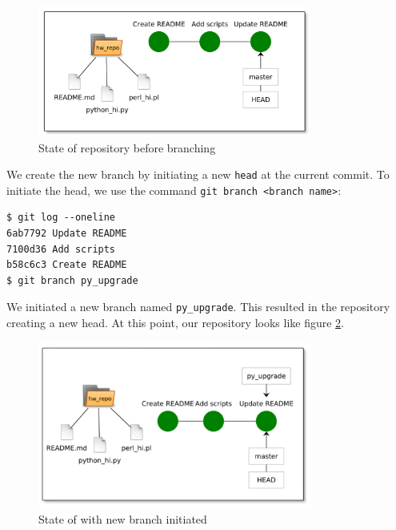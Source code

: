 \documentclass[../main/git_course_main.tex]{subfiles}
\begin{document}
\begin{figure}[h!]
	\centering
	\includegraphics[width=0.8\textwidth]{../visualizations/chapter2/c26_repo_third_commit.pdf}
	\caption{State of repository before branching}
	\label{fig:state_before_branching}
\end{figure}

We create the new branch by initiating a new \verb$head$ at the current commit. To initiate the head, we use the command \verb$git branch <branch name>$:

\begin{codebox}
\begin{lstlisting}
$ git log --oneline
6ab7792 Update README
7100d36 Add scripts
b58c6c3 Create README
$ git branch py_upgrade
\end{lstlisting}
\end{codebox}

We initiated a new branch named \verb$py_upgrade$. This resulted in the repository creating a new head. At this point, our repository looks like figure \ref{fig:branch_initiated}.

\begin{figure}[h!]
	\centering
	\includegraphics[width=0.8\textwidth]{../visualizations/chapter4/42_branch_initiated.pdf}
	\caption{State of with new branch initiated}
	\label{fig:branch_initiated}
\end{figure}
\end{document}
